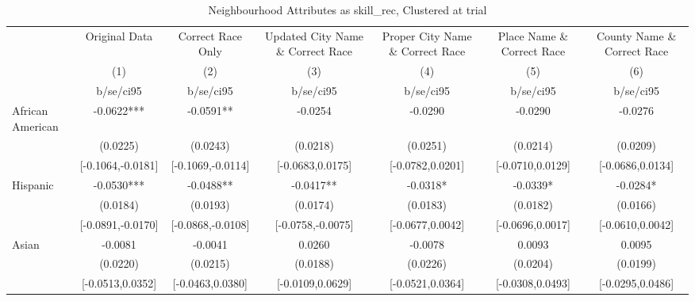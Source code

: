 \documentclass{article}
\begin{document}
\begin{table}[htbp]\centering
\def\sym#1{\ifmmode^{#1}\else\(^{#1}\)\fi}
\caption{Neighbourhood Attributes as skill\_rec, Clustered at trial}
\begin{tabular}{l*{6}{c}}
\toprule
                    &\multicolumn{1}{c}{Original Data}&\multicolumn{1}{c}{Correct Race Only}&\multicolumn{1}{c}{Updated City Name \& Correct Race}&\multicolumn{1}{c}{Proper City Name \& Correct Race}&\multicolumn{1}{c}{Place Name \& Correct Race}&\multicolumn{1}{c}{County Name \& Correct Race}\\\cmidrule(lr){2-2}\cmidrule(lr){3-3}\cmidrule(lr){4-4}\cmidrule(lr){5-5}\cmidrule(lr){6-6}\cmidrule(lr){7-7}
                    &\multicolumn{1}{c}{(1)}   &\multicolumn{1}{c}{(2)}   &\multicolumn{1}{c}{(3)}   &\multicolumn{1}{c}{(4)}   &\multicolumn{1}{c}{(5)}   &\multicolumn{1}{c}{(6)}   \\
                    &   b/se/ci95   &   b/se/ci95   &   b/se/ci95   &   b/se/ci95   &   b/se/ci95   &   b/se/ci95   \\
\midrule
African American    &     -0.0622***&     -0.0591** &     -0.0254   &     -0.0290   &     -0.0290   &     -0.0276   \\
                    &    (0.0225)   &    (0.0243)   &    (0.0218)   &    (0.0251)   &    (0.0214)   &    (0.0209)   \\
                    &[-0.1064,-0.0181]   &[-0.1069,-0.0114]   &[-0.0683,0.0175]   &[-0.0782,0.0201]   &[-0.0710,0.0129]   &[-0.0686,0.0134]   \\
Hispanic            &     -0.0530***&     -0.0488** &     -0.0417** &     -0.0318*  &     -0.0339*  &     -0.0284*  \\
                    &    (0.0184)   &    (0.0193)   &    (0.0174)   &    (0.0183)   &    (0.0182)   &    (0.0166)   \\
                    &[-0.0891,-0.0170]   &[-0.0868,-0.0108]   &[-0.0758,-0.0075]   &[-0.0677,0.0042]   &[-0.0696,0.0017]   &[-0.0610,0.0042]   \\
Asian               &     -0.0081   &     -0.0041   &      0.0260   &     -0.0078   &      0.0093   &      0.0095   \\
                    &    (0.0220)   &    (0.0215)   &    (0.0188)   &    (0.0226)   &    (0.0204)   &    (0.0199)   \\
                    &[-0.0513,0.0352]   &[-0.0463,0.0380]   &[-0.0109,0.0629]   &[-0.0521,0.0364]   &[-0.0308,0.0493]   &[-0.0295,0.0486]   \\

\end{tabular}
\end{table}
\end{document}
